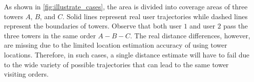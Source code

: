 As shown in \autoref{fig:illustrate_cases}, the area is divided into coverage areas of three towers $A$, $B$, and $C$. Solid lines represent real user trajectories while dashed lines represent the boundaries of towers. Observe that both user $1$ and user $2$ pass the three towers in the same order $A - B - C$. The real distance differences, however, are missing due to the limited location estimation accuracy of using tower locations. Therefore, in such cases, a single distance estimate will have to fail due to the wide variety of possible trajectories that can lead to the same tower visiting orders.

